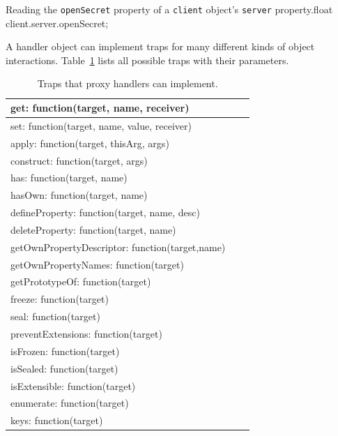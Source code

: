 \begin{code}{Reading the \lstinline{openSecret} property of a \lstinline{client} object's \lstinline{server} property.}{float}
client.server.openSecret;
\end{code}
\label{lst:propertyRead}
\iffalse
\end{verbatim}\fi

A handler object can implement traps for many different kinds of object interactions.
Table~\ref{table:traps} lists all possible traps with their parameters.

\begin{table}[h]
\begin{center}
\begin{tabular}{|l|l|r|}
\hline
get: function(target, name, receiver) \\ \hline
set: function(target, name, value, receiver) \\ \hline
apply: function(target, thisArg, args) \\ \hline
construct: function(target, args) \\ \hline
has: function(target, name) \\ \hline
hasOwn: function(target, name) \\ \hline
defineProperty: function(target, name, desc) \\ \hline
deleteProperty: function(target, name) \\ \hline
getOwnPropertyDescriptor: function(target,name) \\ \hline
getOwnPropertyNames: function(target) \\ \hline
getPrototypeOf: function(target) \\ \hline
freeze: function(target) \\ \hline
seal: function(target) \\ \hline
preventExtensions: function(target) \\ \hline
isFrozen: function(target) \\ \hline
isSealed: function(target) \\ \hline
isExtensible: function(target) \\ \hline
enumerate: function(target) \\ \hline
keys: function(target) \\ \hline
\end{tabular}
\caption[Table caption text]{Traps that proxy handlers can implement.}
\label{table:traps}
\end{center}
\end{table}


